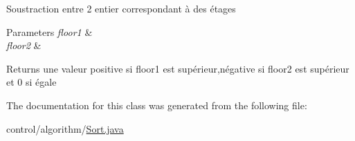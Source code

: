 Soustraction entre 2 entier correspondant à des étages 
\begin{DoxyParams}{Parameters}
{\em floor1} & \\
\hline
{\em floor2} & \\
\hline
\end{DoxyParams}
\begin{DoxyReturn}{Returns}
une valeur positive si floor1 est supérieur,négative si floor2 est supérieur et 0 si égale 
\end{DoxyReturn}


The documentation for this class was generated from the following file\+:\begin{DoxyCompactItemize}
\item 
control/algorithm/\mbox{\hyperlink{_sort_8java}{Sort.\+java}}\end{DoxyCompactItemize}
